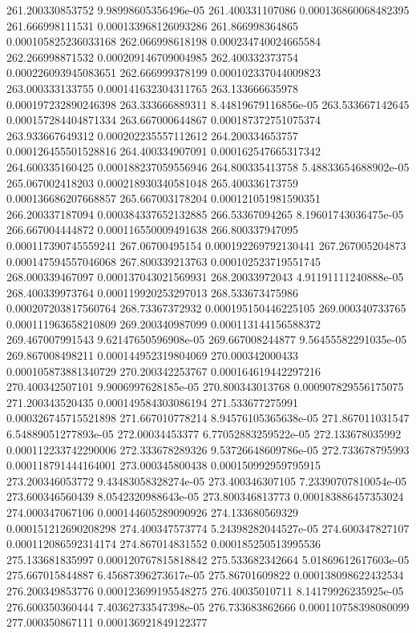 {261.200330853752 9.98998605356496e-05
261.400331107086 0.000136860068482395
261.666998111531 0.000133968126093286
261.866998364865 0.000105825236033168
262.066998618198 0.000234740024665584
262.266998871532 0.000209146709004985
262.400332373754 0.000226093945083651
262.666999378199 0.000102337044009823
263.000333133755 0.000141632304311765
263.133666635978 0.000197232890246398
263.333666889311 8.44819679116856e-05
263.533667142645 0.000157284404871334
263.667000644867 0.000187372751075374
263.933667649312 0.000202235557112612
264.200334653757 0.000126455501528816
264.400334907091 0.000162547665317342
264.600335160425 0.000188237059556946
264.800335413758 5.48833654688902e-05
265.067002418203 0.000218930340581048
265.400336173759 0.000136686207668857
265.667003178204 0.000121051981590351
266.200337187094 0.000384337652132885
266.53367094265 8.19601743036475e-05
266.667004444872 0.000116550009491638
266.800337947095 0.000117390745559241
267.06700495154 0.000192269792130441
267.267005204873 0.000147594557046068
267.800339213763 0.000102523719551745
268.000339467097 0.000137043021569931
268.20033972043 4.91191111240888e-05
268.400339973764 0.000119920253297013
268.533673475986 0.000207203817560764
268.73367372932 0.000195150446225105
269.000340733765 0.000111963658210809
269.200340987099 0.000113144156588372
269.467007991543 9.62147650596908e-05
269.667008244877 9.56455582291035e-05
269.867008498211 0.000144952319804069
270.000342000433 0.000105873881340729
270.200342253767 0.000164619442297216
270.400342507101 9.9006997628185e-05
270.800343013768 0.000907829556175075
271.200343520435 0.000149584303086194
271.533677275991 0.000326745715521898
271.667010778214 8.94576105365638e-05
271.867011031547 6.54889051277893e-05
272.00034453377 6.77052883259522e-05
272.133678035992 0.000112233742290006
272.333678289326 9.53726648609786e-05
272.733678795993 0.000118791444164001
273.000345800438 0.000150992959795915
273.200346053772 9.43483058328274e-05
273.400346307105 7.23390707810054e-05
273.600346560439 8.0542320988643e-05
273.800346813773 0.000183886457353024
274.000347067106 0.000144605289090926
274.133680569329 0.000151212690208298
274.400347573774 5.24398282044527e-05
274.600347827107 0.000112086592314174
274.867014831552 0.000185250513995536
275.133681835997 0.000120767815818842
275.533682342664 5.01869612617603e-05
275.667015844887 6.45687396273617e-05
275.86701609822 0.000138098622432534
276.200349853776 0.000123699195548275
276.40035010711 8.14179926235925e-05
276.600350360444 7.40362733547398e-05
276.733683862666 0.000110758398080099
277.000350867111 0.000136921849122377
}
